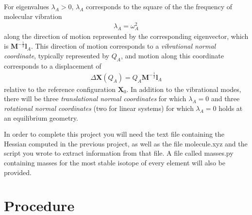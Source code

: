 \documentclass[11pt]{article}
\newcommand{\ttf}[1]{{\ttfamily #1}}
\newcommand{\bo}[1]{\ensuremath{\mathbf{#1}}}
\newcommand{\w}{\ensuremath{\omega}}
\newcommand{\D}{\ensuremath{\Delta}}
\newcommand{\la}{\ensuremath{\lambda}}
\begin{document}
For eigenvalues $\la_A>0$, $\la_A$ corresponds to the square of the the frequency of molecular vibration
\begin{align}
	\la_A = \w_A^2
\end{align}
along the direction of motion represented by the corresponding eigenvector, which is $\bo{M}^{-\frac{1}{2}}\bm{l}_A$.
This direction of motion corresponds to a {\it vibrational normal coordinate}, typically represented by $Q_A$, and motion along this coordinate corresponds to a displacement of
\begin{align}
%
	\D\bo{X}(Q_A)
=
	Q_A\bo{M}^{-\frac{1}{2}}\bm{l}_A
\end{align}
relative to the reference configuration $\bo{X}_0$.
In addition to the vibrational modes, there will be three {\it translational normal coordinates} for which $\la_A=0$ and three {\it rotational normal coordinates} (two for linear systems) for which $\la_A=0$ holds at an equilibrium geometry.

In order to complete this project you will need the text file containing the Hessian computed in the previous project, as well as the file \ttf{molecule.xyz} and the script you wrote to extract information from that file.
A file called \ttf{masses.py} containing masses for the most stable isotope of every element will also be provided.


\newpage
\section{Procedure}
\end{document}
